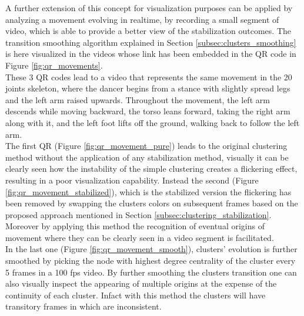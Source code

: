 A further extension of this concept for visualization purposes can be applied by analyzing a movement evolving in realtime, by recording a small segment of video, which is able to provide a better view of the stabilization outcomes.
The transition smoothing algorithm explained in Section \ref{subsec:clusters_smoothing} is here visualized in the videos whose link has been embedded in the QR code in Figure \ref{fig:qr_movements}. \\

These 3 QR codes lead to a video that represents the same movement in the 20 joints skeleton, where the dancer begins from a stance with slightly spread legs and the left arm raised upwards.
Throughout the movement, the left arm descends while moving backward, the torso leans forward, taking the right arm along with it, and the left foot lifts off the ground, walking back to follow the left arm.\\

The first QR (Figure \ref{fig:qr_movement_pure}) leads to the original clustering method without the application of any stabilization method, visually it can be clearly seen how the instability of the simple clustering creates a flickering effect, resulting in a poor visualization capability.
Instead the second (Figure \ref{fig:qr_movement_stabilized}), which is the stabilized version the flickering has been removed by swapping the clusters colors on subsequent frames based on the proposed approach mentioned in Section \ref{subsec:clustering_stabilization}.
Moreover by applying this method the recognition of eventual origins of movement where they can be clearly seen in a video segment is facilitated. \\

In the last one (Figure \ref{fig:qr_movement_smooth}), clusters' evolution is further smoothed by picking the node with highest degree centrality of the cluster every 5 frames in a 100 fps video.
By further smoothing the clusters transition one can also visually inspect the appearing of multiple origins at the expense of the continuity of each cluster. 
Infact with this method the clusters will have transitory frames in which are inconsistent.


